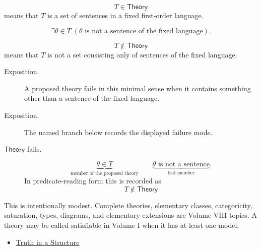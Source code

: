 \begin{remark*}
\[
  T\in\mathsf{Theory}
\] means that \(T\) is a set of sentences in a fixed
first-order language.
\end{remark*}

\begin{remark*}
\[
\exists \theta\in T\;(\theta \text{ is not a sentence of the fixed language}).
\]
\end{remark*}

\begin{remark*}
\[
  T\notin\mathsf{Theory}
\] means that \(T\) is not a set consisting only
of sentences of the fixed language.
\end{remark*}

\begin{remark*}
\begin{description}
  \item[Exposition.] A proposed theory fails in this minimal sense when it contains something other
than a sentence of the fixed language.
\end{description}
\end{remark*}

\begin{remark*}
\begin{description}
  \item[Exposition.] The named branch below records the displayed failure mode.
\item[\(\mathsf{Theory}\) fails.] \[
\underbrace{\theta\in T}_{\text{member of the proposed theory}}
\qquad
\underbrace{\theta \text{ is not a sentence}}_{\text{bad member}}.
\]
  In predicate-reading form this is recorded as
  \[
    T\notin\mathsf{Theory}
  \]
\end{description}
\end{remark*}

\begin{remark*}[Interpretation]
This is intentionally modest. Complete theories, elementary classes,
categoricity, saturation, types, diagrams, and elementary extensions are
Volume VIII topics. A theory may be called satisfiable in Volume I when it has
at least one model.
\end{remark*}

\begin{dependencies}
\begin{itemize}
  \item \hyperref[def:truth-structure]{Truth in a Structure}
\end{itemize}
\end{dependencies}

